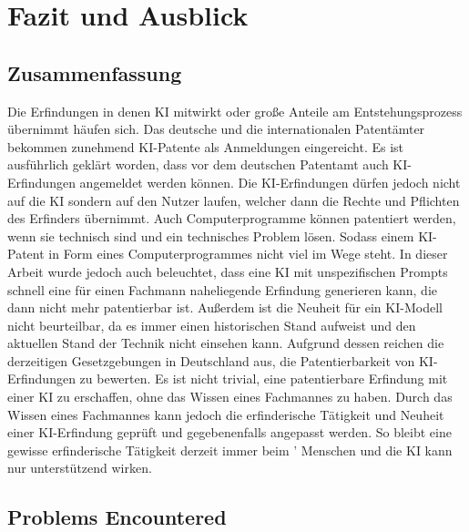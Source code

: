 \chapter{Fazit und Ausblick\label{cha:chapter7}}

\section{Zusammenfassung\label{sec:summary}}

Die Erfindungen in denen KI mitwirkt oder große
Anteile am Entstehungsprozess übernimmt häufen sich.
Das deutsche und die internationalen Patentämter 
bekommen zunehmend KI-Patente als Anmeldungen eingereicht.
Es ist ausführlich geklärt worden, dass vor dem deutschen 
Patentamt auch KI-Erfindungen angemeldet werden können.
Die KI-Erfindungen dürfen jedoch nicht auf die KI
sondern auf den Nutzer laufen, welcher dann die Rechte und
Pflichten des Erfinders übernimmt. Auch Computerprogramme
können patentiert werden, wenn sie technisch sind und
ein technisches Problem lösen. Sodass einem KI-Patent
in Form eines Computerprogrammes nicht viel im Wege steht.
In dieser Arbeit wurde jedoch auch beleuchtet, dass
eine KI mit unspezifischen Prompts schnell eine für einen 
Fachmann naheliegende Erfindung generieren kann, die
dann nicht mehr patentierbar ist. Außerdem ist die Neuheit
für ein KI-Modell nicht beurteilbar, da es immer einen historischen
Stand aufweist und den aktuellen Stand der Technik nicht einsehen 
kann. Aufgrund dessen reichen die derzeitigen Gesetzgebungen in Deutschland
aus, die Patentierbarkeit von KI-Erfindungen zu bewerten. Es ist nicht 
trivial, eine patentierbare Erfindung mit einer KI zu erschaffen,
ohne das Wissen eines Fachmannes zu haben. Durch das Wissen eines
Fachmannes kann jedoch die erfinderische Tätigkeit und Neuheit
einer KI-Erfindung geprüft und gegebenenfalls angepasst werden.
So bleibt eine gewisse erfinderische Tätigkeit derzeit immer beim '
Menschen und die KI kann nur unterstützend wirken.

\section{Problems Encountered\label{sec:problems}}

